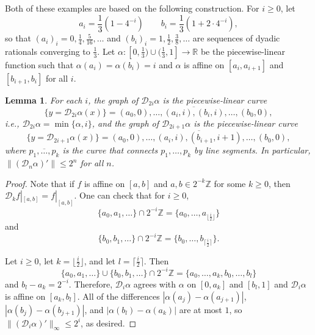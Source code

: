 \documentclass[12pt,reqno]{amsart}
\newcommand{\cD}{\mathcal{D}}
\newcommand{\R}{\mathbb{R}}
\newcommand{\Z}{\mathbb{Z}}
\newcommand{\from}{\colon}
\newtheorem{lemma}[thm]{Lemma}
\theoremstyle{remark}
\newcommand{\0}{\mathbf{0}}
\renewcommand{\1}{\mathbf 1}
\begin{document}
Both of these examples are based on the following construction. For $i\ge 0$, let
\begin{equation}\label{eq:def-ab}
  a_i = \frac{1}{3}(1 - 4^{-i})\qquad b_i = \frac{1}{3}(1 + 2\cdot 4^{-i}),
\end{equation}
so that $(a_i)_i = 0, \frac{1}{4}, \frac{5}{16},\dots$ and $(b_i)_i = 1, \frac{1}{2}, \frac{3}{8}, \dots$ are sequences of dyadic rationals converging to $\frac{1}{3}$. Let $\alpha\from [0,\frac{1}{3}) \cup (\frac{1}{3}, 1] \to \R$ be the piecewise-linear function such that $\alpha(a_i) = \alpha(b_i) = i$ and $\alpha$ is affine on $[a_i, a_{i+1}]$ and $[b_{i+1},b_i]$ for all $i$. 

\begin{lemma}\label{lem:cdf}
  For each $i$, the graph of $\cD_{2i}\alpha$ is the piecewise-linear curve
  \begin{equation}\label{eq:cDf-even}
    \{y = \cD_{2i}\alpha(x)\} = \overline{(a_0,0),\dots, (a_i,i),(b_i,i),\dots, (b_0,0)},
  \end{equation}
  i.e., $\cD_{2i}\alpha = \min\{\alpha,i\}$,
  and the graph of $\cD_{2i+1}\alpha $ is the piecewise-linear curve
  \begin{equation}\label{eq:cDf-odd}
    \{y = \cD_{2i+1}\alpha(x)\} = \overline{(a_0,0),\dots, (a_i,i),(b_{i+1},i+1),\dots, (b_0,0)},
  \end{equation}
  where $\overline{p_1,\dots,p_k}$ is the curve that connects $p_1,\dots,p_k$ by line segments. In particular, $\|(\cD_{n}\alpha)'\|\le 2^{n}$ for all $n$.
\end{lemma}
\begin{proof}
  Note that if $f$ is affine on $[a,b]$ and $a,b \in 2^{-k}\Z$ for some $k \ge 0$, then $\cD_k f|_{[a,b]} = f|_{[a,b]}$.
  One can check that for $i\ge 0$, 
  $$\{a_0,a_1,\dots\} \cap 2^{-i}\Z = \{a_0,\dots,a_{\lfloor\frac{i}{2}\rfloor}\}$$
  and 
  $$\{b_0,b_1,\dots\} \cap 2^{-i}\Z =    \{b_0,\dots,b_{\lceil\frac{i}{2}\rceil}\}.$$

  Let $i\ge 0$, let $k = \lfloor\frac{i}{2}\rfloor$, and let $l = \lceil\frac{i}{2}\rceil$. Then
  $$\{a_0,a_1,\dots\}\cup \{b_0,b_1,\dots\} \cap 2^{-i}\Z = \{a_0,\dots, a_k, b_0,\dots, b_l\}$$
  and $b_l - a_k = 2^{-i}$. Therefore, $\cD_i\alpha$ agrees with $\alpha$ on $[0, a_k]$ and $[b_l, 1]$ and $\cD_i\alpha$ is affine on $[a_k,b_l]$. All of the differences $|\alpha(a_j)-\alpha(a_{j+1})|$, $|\alpha(b_j)-\alpha(b_{j+1})|$, and $|\alpha(b_l)-\alpha(a_{k})|$ are at most $1$, so $\|(\cD_i\alpha)'\|_{\infty}\le 2^{i}$, as desired.
\end{proof}
\end{document}
